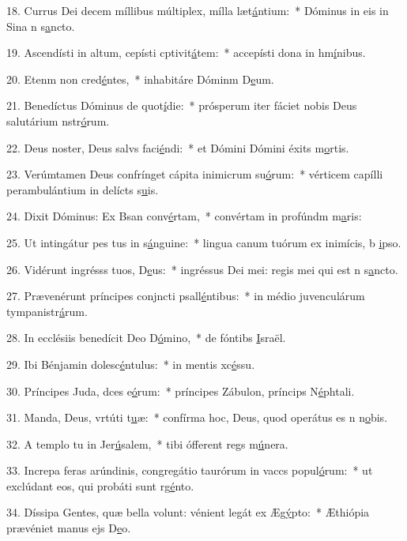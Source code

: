 18. Currus Dei decem míllibus múltiplex, mílla læt\uline{á}ntium:~* Dóminus in eis in Sina n s\uline{a}ncto.\par 
19. Ascendísti in altum, cepísti cptivit\uline{á}tem:~* accepísti dona in hm\uline{í}nibus.\par 
20. Etenm non cred\uline{é}ntes,~* inhabitáre Dóminm D\uline{e}um.\par 
21. Benedíctus Dóminus de quot\uline{í}die:~* prósperum iter fáciet nobis Deus salutárium nstr\uline{ó}rum.\par 
22. Deus noster, Deus salvs faci\uline{é}ndi:~* et Dómini Dómini éxits m\uline{o}rtis.\par 
23. Verúmtamen Deus confrínget cápita inimicrum su\uline{ó}rum:~* vérticem capílli perambulántium in delícts s\uline{u}is.\par 
24. Dixit Dóminus: Ex Bsan conv\uline{é}rtam,~* convértam in profúndm m\uline{a}ris:\par 
25. Ut intingátur pes tus in s\uline{á}nguine:~* lingua canum tuórum ex inimícis, b \uline{i}pso.\par 
26. Vidérunt ingrésss tuos, D\uline{e}us:~* ingréssus Dei mei: regis mei qui est n s\uline{a}ncto.\par 
27. Prævenérunt príncipes conjncti psall\uline{é}ntibus:~* in médio juvenculárum tympanistr\uline{á}rum.\par 
28. In ecclésiis benedícit Deo D\uline{ó}mino,~* de fóntibs \uline{I}sraël.\par 
29. Ibi Bénjamin dolesc\uline{é}ntulus:~* in mentis xc\uline{é}ssu.\par 
30. Príncipes Juda, dces e\uline{ó}rum:~* príncipes Zábulon, príncips N\uline{é}phtali.\par 
31. Manda, Deus, vrtúti t\uline{u}æ:~* confírma hoc, Deus, quod operátus es n n\uline{o}bis.\par 
32. A templo tu in Jer\uline{ú}salem,~* tibi ófferent regs m\uline{ú}nera.\par 
33. Increpa feras arúndinis, congregátio taurórum in vaccs popul\uline{ó}rum:~* ut exclúdant eos, qui probáti sunt rg\uline{é}nto.\par 
34. Díssipa Gentes, quæ bella volunt: vénient legát ex Æg\uline{ý}pto:~* Æthiópia prævéniet manus ejs D\uline{e}o.\par 
